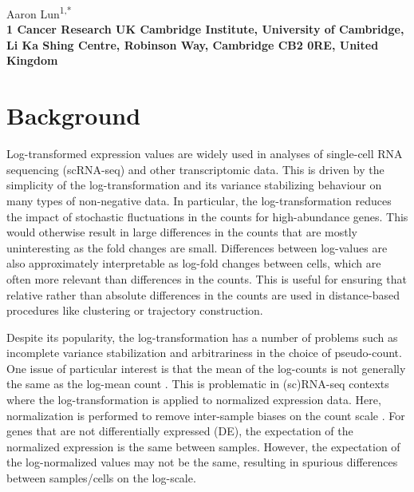 \documentclass[10pt,letterpaper]{article}
\begin{document}
\vspace*{0.35in}

\begin{flushleft}
{\Large
    \textbf{}
}
\newline

Aaron Lun\textsuperscript{1,*}
\\
\bigskip
\bf{1} Cancer Research UK Cambridge Institute, University of Cambridge, Li Ka Shing Centre, Robinson Way, Cambridge CB2 0RE, United Kingdom \\
\bigskip

\end{flushleft}

\section{Background}
Log-transformed expression values are widely used in analyses of single-cell RNA sequencing (scRNA-seq) and other transcriptomic data.
This is driven by the simplicity of the log-transformation and its variance stabilizing behaviour on many types of non-negative data.
In particular, the log-transformation reduces the impact of stochastic fluctuations in the counts for high-abundance genes.
This would otherwise result in large differences in the counts that are mostly uninteresting as the fold changes are small.
Differences between log-values are also approximately interpretable as log-fold changes between cells, which are often more relevant than differences in the counts.
This is useful for ensuring that relative rather than absolute differences in the counts are used in distance-based procedures like clustering or trajectory construction.

Despite its popularity, the log-transformation has a number of problems such as incomplete variance stabilization and arbitrariness in the choice of pseudo-count.
One issue of particular interest is that the mean of the log-counts is not generally the same as the log-mean count \cite{hicks2017missing}.
This is problematic in (sc)RNA-seq contexts where the log-transformation is applied to normalized expression data.
Here, normalization is performed to remove inter-sample biases on the count scale \cite{robinson2010scaling,lun2016pooling}.
For genes that are not differentially expressed (DE), the expectation of the normalized expression is the same between samples.
However, the expectation of the log-normalized values may not be the same, resulting in spurious differences between samples/cells on the log-scale.
\end{document}

